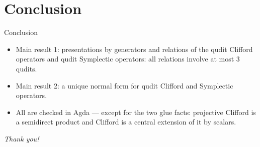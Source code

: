 \documentclass[aspectratio=169]{beamer}
\begin{document}
\section{Conclusion}

\begin{frame}{Conclusion}
  \begin{itemize}
    \item \alert{Main result 1}: presentations by generators and
      relations of the qudit Clifford operators and qudit Symplectic
      operators: all relations involve at most $3$ qudits.
    \item \alert{Main result 2}: a unique normal form for qudit
      Clifford and Symplectic operators.
    \item \alert{All are checked in Agda} --- except for the two glue
      facts: projective Clifford is a semidirect product and Clifford
      is a central extension of it by scalars.
  \end{itemize}
  \vfill
  \begin{center}
    \emph{Thank you!}
  \end{center}
\end{frame}
\end{document}
